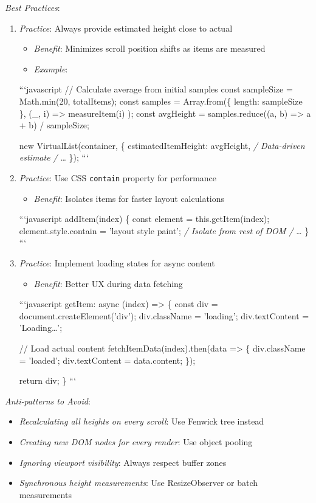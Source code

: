 \documentclass[11pt]{article}
\begin{document}
\emph{Best Practices}:

\begin{enumerate}
\item \emph{Practice}: Always provide estimated height close to actual
\begin{itemize}
\item \emph{Benefit}: Minimizes scroll position shifts as items are measured
\item \emph{Example}:
\end{itemize}
```javascript
// Calculate average from initial samples
const sampleSize = Math.min(20, totalItems);
const samples = Array.from(\{ length: sampleSize \}, (\_, i) => 
  measureItem(i)
);
const avgHeight = samples.reduce((a, b) => a + b) / sampleSize;

new VirtualList(container, \{
  estimatedItemHeight: avgHeight, \emph{/ Data-driven estimate
  /} \ldots{}
\});
```

\item \emph{Practice}: Use CSS \texttt{contain} property for performance
\begin{itemize}
\item \emph{Benefit}: Isolates items for faster layout calculations
\end{itemize}
```javascript
addItem(index) \{
  const element = this.getItem(index);
  element.style.contain = 'layout style paint'; \emph{/ Isolate from rest of DOM
  /} \ldots{}
\}
```

\item \emph{Practice}: Implement loading states for async content
\begin{itemize}
\item \emph{Benefit}: Better UX during data fetching
\end{itemize}
```javascript
getItem: async (index) => \{
  const div = document.createElement('div');
  div.className = 'loading';
  div.textContent = 'Loading\ldots{}';

// Load actual content
fetchItemData(index).then(data => \{
  div.className = 'loaded';
  div.textContent = data.content;
\});

  return div;
\}
```
\end{enumerate}

\emph{Anti-patterns to Avoid}:

\begin{itemize}
\item \emph{Recalculating all heights on every scroll}: Use Fenwick tree instead
\item \emph{Creating new DOM nodes for every render}: Use object pooling
\item \emph{Ignoring viewport visibility}: Always respect buffer zones
\item \emph{Synchronous height measurements}: Use ResizeObserver or batch measurements
\end{itemize}
\end{document}
